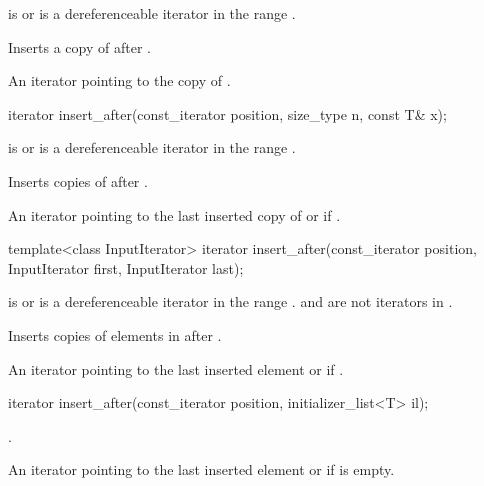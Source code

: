 \begin{itemdescr}
\pnum
\requires {} is  or is a dereferenceable
iterator in the range .

\pnum
\effects Inserts a copy of  after .

\pnum
\returns An iterator pointing to the copy of .
\end{itemdescr}

%
\begin{itemdecl}
iterator insert_after(const_iterator position, size_type n, const T& x);
\end{itemdecl}

\begin{itemdescr}
\pnum
\requires {} is  or is a dereferenceable
iterator in the range .

\pnum
\effects Inserts  copies of  after .

\pnum
\returns
An iterator pointing to the last inserted copy of  or  if .
\end{itemdescr}

%
\begin{itemdecl}
template<class InputIterator>
  iterator insert_after(const_iterator position, InputIterator first, InputIterator last);
\end{itemdecl}

\begin{itemdescr}
\pnum
\requires {} is  or is a dereferenceable
iterator in the range .
 and  are not iterators in .

\pnum
\effects Inserts copies of elements in  after .

\pnum
\returns
An iterator pointing to the last inserted element or  if .
\end{itemdescr}

%
\begin{itemdecl}
iterator insert_after(const_iterator position, initializer_list<T> il);
\end{itemdecl}

\begin{itemdescr}
\pnum
\effects {}.

\pnum
\returns
An iterator pointing to the last inserted element or  if  is empty.
\end{itemdescr}


